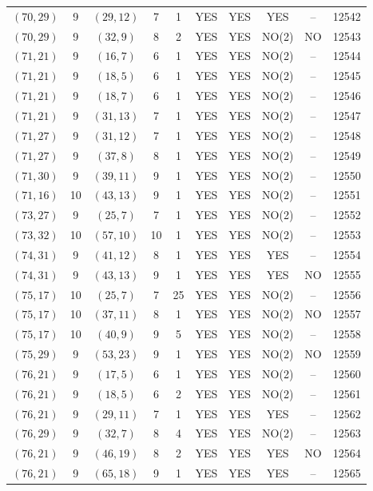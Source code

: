 \begin{longtable}{|c|c|c|c|c|c|c|c|c|c|}
$(70, 29)$ & 9 & $(29, 12)$ & 7 & 1 & YES & YES & YES & -- & 12542\\
$(70, 29)$ & 9 & $(32, 9)$ & 8 & 2 & YES & YES & NO(2) & NO & 12543\\
$(71, 21)$ & 9 & $(16, 7)$ & 6 & 1 & YES & YES & NO(2) & -- & 12544\\
$(71, 21)$ & 9 & $(18, 5)$ & 6 & 1 & YES & YES & NO(2) & -- & 12545\\
$(71, 21)$ & 9 & $(18, 7)$ & 6 & 1 & YES & YES & NO(2) & -- & 12546\\
$(71, 21)$ & 9 & $(31, 13)$ & 7 & 1 & YES & YES & NO(2) & -- & 12547\\
$(71, 27)$ & 9 & $(31, 12)$ & 7 & 1 & YES & YES & NO(2) & -- & 12548\\
$(71, 27)$ & 9 & $(37, 8)$ & 8 & 1 & YES & YES & NO(2) & -- & 12549\\
$(71, 30)$ & 9 & $(39, 11)$ & 9 & 1 & YES & YES & NO(2) & -- & 12550\\
$(71, 16)$ & 10 & $(43, 13)$ & 9 & 1 & YES & YES & NO(2) & -- & 12551\\
$(73, 27)$ & 9 & $(25, 7)$ & 7 & 1 & YES & YES & NO(2) & -- & 12552\\
$(73, 32)$ & 10 & $(57, 10)$ & 10 & 1 & YES & YES & NO(2) & -- & 12553\\
$(74, 31)$ & 9 & $(41, 12)$ & 8 & 1 & YES & YES & YES & -- & 12554\\
$(74, 31)$ & 9 & $(43, 13)$ & 9 & 1 & YES & YES & YES & NO & 12555\\
$(75, 17)$ & 10 & $(25, 7)$ & 7 & 25 & YES & YES & NO(2) & -- & 12556\\
$(75, 17)$ & 10 & $(37, 11)$ & 8 & 1 & YES & YES & NO(2) & NO & 12557\\
$(75, 17)$ & 10 & $(40, 9)$ & 9 & 5 & YES & YES & NO(2) & -- & 12558\\
$(75, 29)$ & 9 & $(53, 23)$ & 9 & 1 & YES & YES & NO(2) & NO & 12559\\
$(76, 21)$ & 9 & $(17, 5)$ & 6 & 1 & YES & YES & NO(2) & -- & 12560\\
$(76, 21)$ & 9 & $(18, 5)$ & 6 & 2 & YES & YES & NO(2) & -- & 12561\\
$(76, 21)$ & 9 & $(29, 11)$ & 7 & 1 & YES & YES & YES & -- & 12562\\
$(76, 29)$ & 9 & $(32, 7)$ & 8 & 4 & YES & YES & NO(2) & -- & 12563\\
$(76, 21)$ & 9 & $(46, 19)$ & 8 & 2 & YES & YES & YES & NO & 12564\\
$(76, 21)$ & 9 & $(65, 18)$ & 9 & 1 & YES & YES & YES & -- & 12565\\

\end{longtable}
